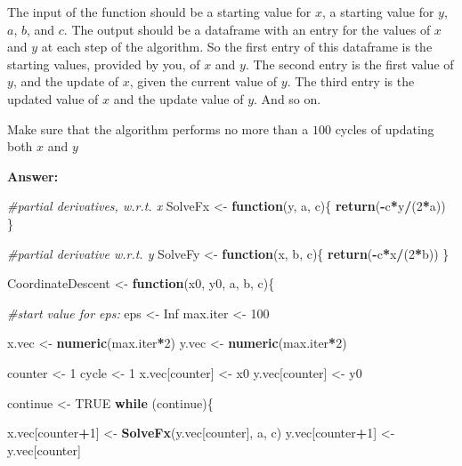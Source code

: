 \documentclass[]{article}
\newenvironment{Shaded}{\begin{snugshade}}{\end{snugshade}}
\newcommand{\CommentTok}[1]{\textcolor[rgb]{0.56,0.35,0.01}{\textit{#1}}}
\newcommand{\ControlFlowTok}[1]{\textcolor[rgb]{0.13,0.29,0.53}{\textbf{#1}}}
\newcommand{\DecValTok}[1]{\textcolor[rgb]{0.00,0.00,0.81}{#1}}
\newcommand{\KeywordTok}[1]{\textcolor[rgb]{0.13,0.29,0.53}{\textbf{#1}}}
\newcommand{\NormalTok}[1]{#1}
\newcommand{\OperatorTok}[1]{\textcolor[rgb]{0.81,0.36,0.00}{\textbf{#1}}}
\newcommand{\OtherTok}[1]{\textcolor[rgb]{0.56,0.35,0.01}{#1}}
\newcommand{\StringTok}[1]{\textcolor[rgb]{0.31,0.60,0.02}{#1}}
\begin{document}
The input of the function should be a starting value for \(x\), a
starting value for \(y\), \(a\), \(b\), and \(c\). The output should be
a dataframe with an entry for the values of \(x\) and \(y\) at each step
of the algorithm. So the first entry of this dataframe is the starting
values, provided by you, of \(x\) and \(y\). The second entry is the
first value of \(y\), and the update of \(x\), given the current value
of \(y\). The third entry is the updated value of \(x\) and the update
value of \(y\). And so on.

Make sure that the algorithm performs no more than a \(100\) cycles of
updating both \(x\) and \(y\)

\textbf{Answer:}

\begin{Shaded}
\begin{Highlighting}[]
\CommentTok{#partial derivatives, w.r.t. x}
\NormalTok{SolveFx <-}\StringTok{ }\ControlFlowTok{function}\NormalTok{(y, a, c)\{}
  \KeywordTok{return}\NormalTok{(}\OperatorTok{-}\NormalTok{c}\OperatorTok{*}\NormalTok{y}\OperatorTok{/}\NormalTok{(}\DecValTok{2}\OperatorTok{*}\NormalTok{a))}
\NormalTok{\}}

\CommentTok{#partial derivative w.r.t. y}
\NormalTok{SolveFy <-}\StringTok{ }\ControlFlowTok{function}\NormalTok{(x, b, c)\{}
  \KeywordTok{return}\NormalTok{(}\OperatorTok{-}\NormalTok{c}\OperatorTok{*}\NormalTok{x}\OperatorTok{/}\NormalTok{(}\DecValTok{2}\OperatorTok{*}\NormalTok{b))}
\NormalTok{\}}

\NormalTok{CoordinateDescent <-}\StringTok{ }\ControlFlowTok{function}\NormalTok{(x0, y0, a, b, c)\{}
  
  \CommentTok{#start value for eps:}
\NormalTok{  eps <-}\StringTok{ }\OtherTok{Inf}
\NormalTok{  max.iter <-}\StringTok{ }\DecValTok{100}
  
\NormalTok{  x.vec <-}\StringTok{ }\KeywordTok{numeric}\NormalTok{(max.iter}\OperatorTok{*}\DecValTok{2}\NormalTok{)}
\NormalTok{  y.vec <-}\StringTok{ }\KeywordTok{numeric}\NormalTok{(max.iter}\OperatorTok{*}\DecValTok{2}\NormalTok{)}
  
\NormalTok{  counter <-}\StringTok{ }\DecValTok{1}
\NormalTok{  cycle <-}\StringTok{ }\DecValTok{1}
\NormalTok{  x.vec[counter] <-}\StringTok{ }\NormalTok{x0}
\NormalTok{  y.vec[counter] <-}\StringTok{ }\NormalTok{y0}
  
\NormalTok{  continue <-}\StringTok{ }\OtherTok{TRUE}
  \ControlFlowTok{while}\NormalTok{ (continue)\{}
    
\NormalTok{    x.vec[counter}\OperatorTok{+}\DecValTok{1}\NormalTok{] <-}\StringTok{ }\KeywordTok{SolveFx}\NormalTok{(y.vec[counter], a, c)}
\NormalTok{    y.vec[counter}\OperatorTok{+}\DecValTok{1}\NormalTok{] <-}\StringTok{ }\NormalTok{y.vec[counter]}
      

\end{Highlighting}
\end{Shaded}
\end{document}
